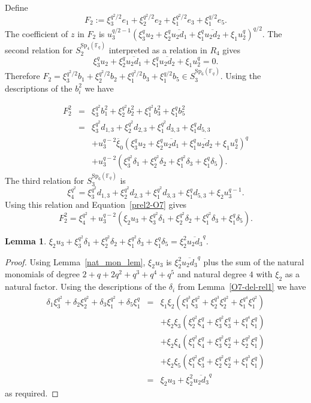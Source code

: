 \documentclass{amsart}
\newtheorem{lemma}[subsection]{Lemma}
\newcommand{\field}{\mathbb{F}}
\newcommand{\syp}[2]{{{\text{Sp}_{{#1}}(\field_{#2})}}}
\begin{document}
Define $$F_2:=\xi_3^{q^2/2}e_1+\xi_2^{q^2/2}e_2+\xi_1^{q^2/2}e_3+\xi_1^{q/2}e_5.$$
The coefficient of $z$ in $F_2$ is 
$u_3^{q/2-1}(\xi_3^qu_2+\xi_2^q\overline{u_2d_1}+\xi_1^q\overline{u_2d_2}+\xi_1u_2^q)^{q/2}$.
The second relation for $S_2^{\syp{4}{q}}$ interpreted as a relation in $R_4$ gives
\begin{equation}\label{prel2-O7}
 \xi_3^qu_2+\xi_2^q\overline{u_2d_1}+\xi_1^q\overline{u_2d_2}+\xi_1u_2^q=0.
 \end{equation}
Therefore $F_2=\xi_3^{q^2/2}b_1+\xi_2^{q^2/2}b_2+\xi_1^{q^2/2}b_3+\xi_1^{q/2}b_5\in S_3^{\syp{6}{q}}$.
Using the descriptions of the $b_i^2$ we have

\begin{eqnarray*}
F_2^2&=&\xi_3^{q^2} b_1^2+\xi_2^{q^2} b_2^2+\xi_1^{q^2} b_3^2+\xi_1^q b_5^2\\
&=&\xi_3^{q^2} d_{1,3} +\xi_2^{q^2} d_{2,3}+\xi_1^{q^2} d_{3,3}+\xi_1^q d_{5,3}\\
&&+ u_3^{q-2}\overline{\xi}_0(\xi_3^q u_2+\xi_2^q\overline{u_2d_1}+\xi_1^q\overline{u_2d_2}+\xi_1u_2^q)^q\\
&&+u_3^{q-2}(\xi_3^{q^2} \delta_1+\xi_2^{q^2} \delta_2+\xi_1^{q^2} \delta_3+\xi_1^q \delta_5).
\end{eqnarray*}
The third relation for $S_3^{\syp{6}{q}}$ is $$\xi_4^{q^2}=\xi_3^{q^2} d_{1,3} +\xi_2^{q^2} d_{2,3}+\xi_1^{q^2} d_{3,3}+\xi_1^q d_{5,3}+\xi_2 u_3^{q-1}.$$
Using this relation and Equation~\ref{prel2-O7} gives
$$F_2^2=\xi_4^{q^2} +u_3^{q-2}(\xi_2 u_3+\xi_3^{q^2} \delta_1+\xi_2^{q^2} \delta_2+\xi_1^{q^2} \delta_3+\xi_1^q \delta_5).$$


\begin{lemma}\label{O7-del-rel2} $\xi_2 u_3+\xi_3^{q^2} \delta_1+\xi_2^{q^2} \delta_2+\xi_1^{q^2} \delta_3+\xi_1^q \delta_5=\xi_2^2 \overline{u_2d_3}^q$.
\end{lemma}
\begin{proof} Using Lemma~\ref{nat_mon_lem}, $\xi_2 u_3$ is $\xi_2^2 \overline{u_2d_3}^q$ plus the sum of the natural monomials of degree
$2+q+2q^2+q^3+q^4+q^5$ and natural degree $4$ with $\xi_2$ as a natural factor.  Using the descriptions of the $\delta_i$ 
from Lemma~\ref{O7-del-rel1} we have
\begin{eqnarray*}
\delta_1\xi_3^{q^2}+\delta_2\xi_2^{q^2}+\delta_3\xi_1^{q^2}+\delta_5\xi_1^q
&=&\xi_1\xi_2\left(\xi_1^{q^3}\xi_3^{q^2}+\xi_2^{q^3}\xi_2^{q^2}+\xi_1^{q^4}\xi_1^{q^2}\right)\\
&&+\xi_2\xi_3\left(\xi_2^{q^2}\xi_4^q+\xi_3^{q^2}\xi_3^q+\xi_1^{q^4}\xi_1^q\right)\\
&&+\xi_2\xi_4\left(\xi_1^{q^2}\xi_4^q+\xi_3^{q^2}\xi_2^q+\xi_2^{q^2}\xi_1^q\right)\\
&&+\xi_2\xi_5\left(\xi_1^{q^2}\xi_3^q+\xi_2^{q^2}\xi_2^q+\xi_1^{q^3}\xi_1^q\right)\\
&=&\xi_2u_3+\xi_2^2\overline{u_2d_3}^q
\end{eqnarray*}
as required.
\end{proof}
\end{document}

